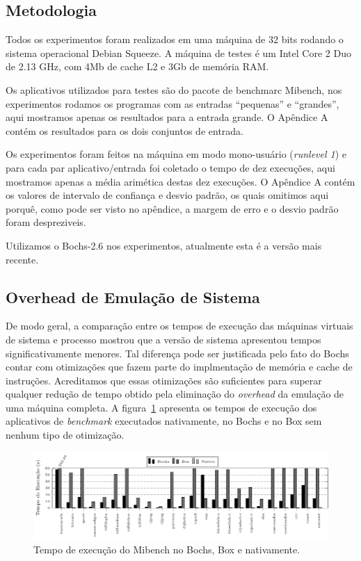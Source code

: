 \documentclass[11pt,twoside]{article}
\begin{document}
\subsection{Metodologia}

Todos os experimentos foram realizados em uma máquina de 32 bits rodando o
sistema operacional Debian Squeeze. A máquina de testes é um Intel Core 2 Duo
de 2.13 GHz, com 4Mb de cache L2 e 3Gb de memória RAM.

Os aplicativos utilizados para testes são do pacote de benchmarc Mibench, nos
experimentos rodamos os programas com as entradas ``pequenas'' e ``grandes'',
aqui mostramos apenas os resultados para a entrada grande. O Apêndice A contém
os resultados para os dois conjuntos de entrada.

Os experimentos foram feitos na máquina em modo mono-usuário (\textit{runlevel
  1}) e para cada par aplicativo/entrada foi coletado o tempo de dez execuções,
aqui mostramos apenas a média arimética destas dez execuções. O Apêndice A
contém os valores de intervalo de confiança e desvio padrão, os quais omitimos
aqui porquê, como pode ser visto no apêndice, a margem de erro e o desvio padrão
foram despreziveis.

Utilizamos o Bochs-2.6 nos experimentos, atualmente esta é a versão mais recente.


\subsection{Overhead de Emulação de Sistema}

De modo geral, a comparação entre os tempos de execução das máquinas virtuais de
sistema e processo mostrou que a versão de sistema apresentou tempos
significativamente menores. Tal diferença pode ser justificada pelo fato do
Bochs contar com otimizações que fazem parte do implmentação de memória e cache
de instruções. Acreditamos que essas otimizações são suficientes para superar
qualquer redução de tempo obtido pela eliminação do \emph{overhead} da emulação de uma
máquina completa. A figura~\ref{fig:bochs_nocache_nativo} apresenta os tempos de
execução dos aplicativos de \emph{benchmark} executados nativamente, no Bochs e
no Box sem nenhum tipo de otimização.

\begin{figure}[h]
	\centering
	\includegraphics[width=1.0\textwidth]{figures/bochs_nocache_nativo}
	\caption{Tempo de execução do Mibench no Bochs, Box e nativamente.}
	\label{fig:bochs_nocache_nativo}
\end{figure}
\end{document}
